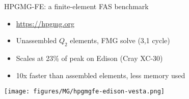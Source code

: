 \documentclass{beamer}
\begin{document}
\begin{frame}{HPGMG-FE: a finite-element FAS benchmark}
  \begin{itemize}
  \item \url{https://hpgmg.org}
  \item Unassembled $Q_2$ elements, FMG solve (3,1 cycle)
  \item Scales at 23\% of peak on Edison (Cray XC-30)
  \item 10x faster than assembled elements, less memory used
  \end{itemize}
  \centering
  \texttt{[image: figures/MG/hpgmgfe-edison-vesta.png]}
\end{frame}
\end{document}
